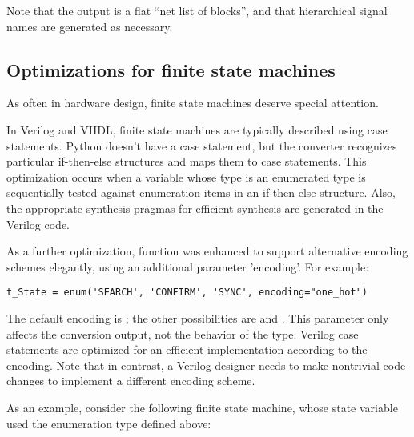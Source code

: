 Note that the output is a flat ``net list of blocks'', and
that hierarchical signal names are generated as necessary.

\subsection{Optimizations for finite state machines\label{conv-usage-fsm}}
As often in hardware design, finite state machines deserve special attention.

In Verilog and VHDL, finite state machines are typically described
using case statements.  Python doesn't have a case statement, but the
converter recognizes particular if-then-else structures and maps them
to case statements. This optimization occurs when a variable whose
type is an enumerated type is sequentially tested against enumeration
items in an if-then-else structure. Also, the appropriate synthesis
pragmas for efficient synthesis are generated in the Verilog code.

As a further optimization, function  was enhanced to support
alternative encoding schemes elegantly, using an additional parameter
'encoding'. For example:

\begin{verbatim}
t_State = enum('SEARCH', 'CONFIRM', 'SYNC', encoding="one_hot")
\end{verbatim}

The default encoding is ; the other possibilities are  and
. This parameter only affects the conversion output, not the
behavior of the type. Verilog case statements are optimized for an
efficient implementation according to the encoding. Note that in
contrast, a Verilog designer needs to make nontrivial code changes to
implement a different encoding scheme.

As an example, consider the following finite state machine, whose
state variable used the enumeration type defined above:

